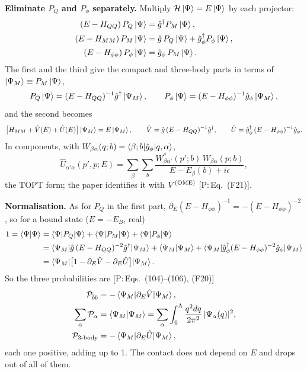\documentclass[11pt,a4paper]{article}
\newcommand{\tagP}[1]{\textcolor{blue!65!black}{\textsf{\small[P:\,#1]}}}
\renewcommand{\VOME}{V^{\rm (OME)}}
\newcommand{\Pbb}{{\cal P}_{\bar bb}}
\newenvironment{aiadd}{\par}{\par}
\begin{document}
\begin{aiadd}
	\textbf{Eliminate $P_Q$ and $P_\phi$ separately.} Multiply $\mathcal H\ket\Psi=E\ket\Psi$ by each projector:
	\begin{align*}
		(E-H_{QQ})\,P_Q\ket\Psi          & =\hat g^\dagger P_M\ket\Psi,                             \\
		(E-H_{MM})\,P_M\ket\Psi          & =\hat g\,P_Q\ket\Psi+\hat g_\phi^\dagger P_\phi\ket\Psi, \\
		(E-H_{\phi\phi})\,P_\phi\ket\Psi & =\hat g_\phi\,P_M\ket\Psi .
	\end{align*}
	The first and the third give the compact and three-body parts in terms of $\ket{\Psi_M}\equiv P_M\ket\Psi$,
	\[
		P_Q\ket\Psi=(E-H_{QQ})^{-1}\hat g^\dagger\ket{\Psi_M},\qquad P_\phi\ket\Psi=(E-H_{\phi\phi})^{-1}\hat g_\phi\ket{\Psi_M},
	\]
	and the second becomes
	\[
		\big[H_{MM}+\hat V(E)+\hat U(E)\big]\ket{\Psi_M}=E\ket{\Psi_M},\qquad
		\hat V=\hat g\,(E-H_{QQ})^{-1}\hat g^\dagger,\qquad
		\hat U=\hat g_\phi^\dagger\,(E-H_{\phi\phi})^{-1}\hat g_\phi .
	\]
	In components, with $W_{\beta\alpha}(q;b)=\braket{\beta;b|\hat g_\phi|q,\alpha}$,
	\[
		\hat U_{\alpha'\alpha}(p',p;E)=\sum_\beta\sum_b\frac{W^*_{\beta\alpha'}(p';b)\,W_{\beta\alpha}(p;b)}{E-E_\beta(b)+i\epsilon},
	\]
	the TOPT form; the paper identifies it with $\VOME$ \tagP{Eq.~(F21)}.

	\textbf{Normalisation.} As for $P_Q$ in the first part, $\partial_E(E-H_{\phi\phi})^{-1}=-(E-H_{\phi\phi})^{-2}$, so for a bound state ($E=-E_B$, real)
	\begin{align*}
		1=\braket{\Psi|\Psi} & =\braket{\Psi|P_Q|\Psi}+\braket{\Psi|P_M|\Psi}+\braket{\Psi|P_\phi|\Psi}                                                                                        \\
		                     & =\braket{\Psi_M|\hat g\,(E-H_{QQ})^{-2}\hat g^\dagger|\Psi_M}+\braket{\Psi_M|\Psi_M}+\braket{\Psi_M|\hat g_\phi^\dagger(E-H_{\phi\phi})^{-2}\hat g_\phi|\Psi_M} \\
		                     & =\braket{\Psi_M|\big[1-\partial_E\hat V-\partial_E\hat U\big]|\Psi_M}.
	\end{align*}
	So the three probabilities are \tagP{Eqs.~(104)--(106), (F20)}
	\begin{align*}
		\Pbb                         & =-\braket{\Psi_M|\partial_E\hat V|\Psi_M},                                                 \\
		\sum_\alpha\mathcal P_\alpha & =\braket{\Psi_M|\Psi_M}=\sum_\alpha\int_0^\Lambda\frac{q^2dq}{2\pi^2}\,|\Psi_\alpha(q)|^2, \\
		\mathcal P_{\text{3-body}}   & =-\braket{\Psi_M|\partial_E\hat U|\Psi_M},
	\end{align*}
	each one positive, adding up to 1. The contact does not depend on $E$ and drops out of all of them.


\end{aiadd}
\end{document}
